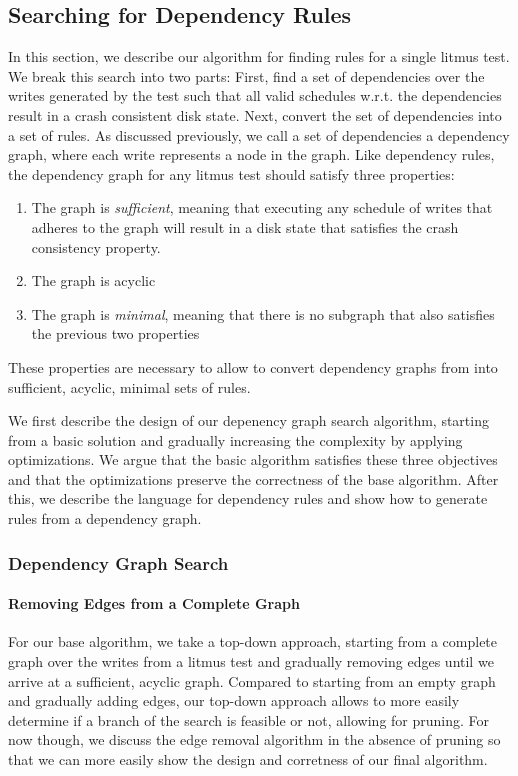 \subsection{Searching for Dependency Rules}
\label{l:rulessearch}
In this section, we describe our algorithm for finding rules for a single
litmus test. We break this search into two parts:
First, find a set of dependencies over the writes generated by the test
such that all valid schedules w.r.t. the dependencies result in
a crash consistent disk state.
Next, convert the set of dependencies into a set of rules.
As discussed previously, we call a set of dependencies
a dependency graph, where each write represents a node in the graph.
Like dependency rules, the dependency graph for any litmus test should satisfy
three properties:
\begin{enumerate}
  \item The graph is \textit{sufficient}, meaning that executing any schedule
        of writes that adheres to the graph will result
        in a disk state that satisfies the crash consistency property.
  \item The graph is acyclic
  \item The graph is \textit{minimal}, meaning that there is no subgraph
        that also satisfies the previous two properties
\end{enumerate}
These properties are necessary to allow \depsynth to convert dependency graphs
from  into sufficient, acyclic, minimal sets of rules.

We first describe the design of our depenency graph
search algorithm, starting from a basic solution and
gradually increasing the complexity by applying optimizations. We argue that
the basic algorithm satisfies these three objectives and that the optimizations
preserve the correctness of the base algorithm.
After this, we describe the language for dependency rules and show how to generate rules
from a dependency graph.

\subsubsection{Dependency Graph Search}
\paragraph{Removing Edges from a Complete Graph}
For our base algorithm, we take a top-down approach, starting from a complete graph
over the writes from a litmus test and gradually removing edges until we arrive
at a sufficient, acyclic graph. Compared to starting from an empty graph and
gradually adding edges, our top-down approach allows \depsynth to more easily
determine if a branch of the search is feasible or not, allowing for pruning.
For now though, we discuss the edge removal algorithm in the absence of pruning
so that we can more easily show the design and corretness of our final algorithm.

